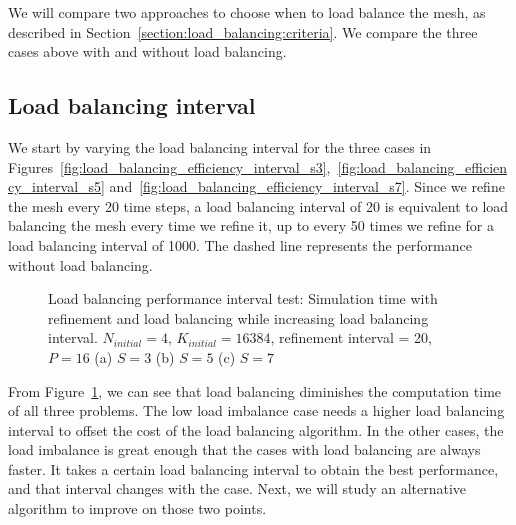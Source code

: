 We will compare two approaches to choose when to load balance the mesh, as described in
Section~\ref{section:load_balancing:criteria}. We compare the three cases above with and without
load balancing.

\subsection{Load balancing interval}\label{subsection:results:load_balancing_performance:interval}

We start by varying the load balancing interval for the three cases in
Figures~\ref{fig:load_balancing_efficiency_interval_s3},~\ref{fig:load_balancing_efficiency_interval_s5}
and~\ref{fig:load_balancing_efficiency_interval_s7}. Since we refine the mesh every 20 time steps, a
load balancing interval of 20 is equivalent to load balancing the mesh every time we refine it, up
to every 50 times we refine for a load balancing interval of 1000. The dashed line represents the
performance without load balancing.

\begin{figure}[H]
	\centering
	\hfill
	\hfill
	\caption{Load balancing performance interval test: Simulation time with refinement and load balancing while increasing load balancing interval. \(N_{initial} = 4\), \(K_{initial} = 16384\), refinement interval = 20, \(P = 16\) (a) \(S = 3\) (b) \(S = 5\) (c) \(S = 7\)}\label{fig:load_balancing_efficiency_interval}
\end{figure}

From Figure~\ref{fig:load_balancing_efficiency_interval}, we can see that load balancing diminishes
the computation time of all three problems. The low load imbalance case needs a higher load
balancing interval to offset the cost of the load balancing algorithm. In the other cases, the load
imbalance is great enough that the cases with load balancing are always faster. It takes a certain
load balancing interval to obtain the best performance, and that interval changes with the case.
Next, we will study an alternative algorithm to improve on those two points.

